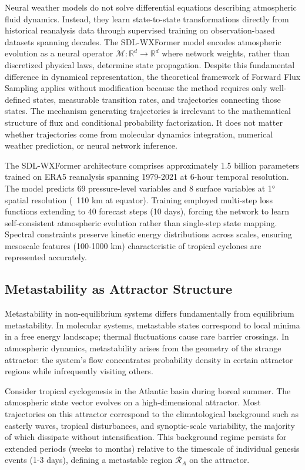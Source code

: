 \documentclass[11pt]{article}
\begin{document}
Neural weather models do not solve differential equations describing atmospheric fluid dynamics. Instead, they learn state-to-state transformations directly from historical reanalysis data through supervised training on observation-based datasets spanning decades. The SDL-WXFormer model encodes atmospheric evolution as a neural operator $\mathcal{M}: \mathbb{R}^d \to \mathbb{R}^d$ where network weights, rather than discretized physical laws, determine state propagation. Despite this fundamental difference in dynamical representation, the theoretical framework of Forward Flux Sampling applies without modification because the method requires only well-defined states, measurable transition rates, and trajectories connecting those states. The mechanism generating trajectories is irrelevant to the mathematical structure of flux and conditional probability factorization. It does not matter whether trajectories come from molecular dynamics integration, numerical weather prediction, or neural network inference.

The SDL-WXFormer architecture comprises approximately 1.5 billion parameters trained on ERA5 reanalysis spanning 1979-2021 at 6-hour temporal resolution. The model predicts 69 pressure-level variables and 8 surface variables at 1° spatial resolution (~110 km at equator). Training employed multi-step loss functions extending to 40 forecast steps (10 days), forcing the network to learn self-consistent atmospheric evolution rather than single-step state mapping. Spectral constraints preserve kinetic energy distributions across scales, ensuring mesoscale features (100-1000 km) characteristic of tropical cyclones are represented accurately.

\subsection{Metastability as Attractor Structure}

Metastability in non-equilibrium systems differs fundamentally from equilibrium metastability. In molecular systems, metastable states correspond to local minima in a free energy landscape; thermal fluctuations cause rare barrier crossings. In atmospheric dynamics, metastability arises from the geometry of the strange attractor: the system's flow concentrates probability density in certain attractor regions while infrequently visiting others.

Consider tropical cyclogenesis in the Atlantic basin during boreal summer. The atmospheric state vector evolves on a high-dimensional attractor. Most trajectories on this attractor correspond to the climatological background such as easterly waves, tropical disturbances, and synoptic-scale variability, the majority of which dissipate without intensification. This background regime persists for extended periods (weeks to months) relative to the timescale of individual genesis events (1-3 days), defining a metastable region $\mathcal{R}_A$ on the attractor.
\end{document}
